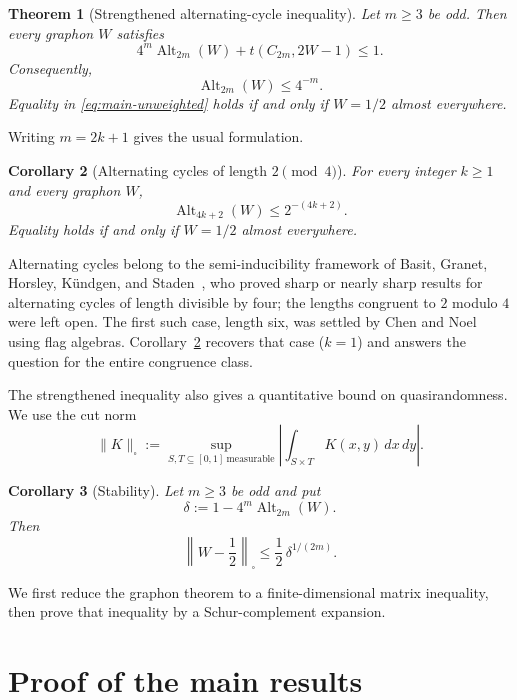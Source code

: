 \documentclass[11pt]{article}
\newtheorem{theorem}{Theorem}[section]
\newtheorem{corollary}[theorem]{Corollary}
\newcommand{\Alt}{\operatorname{Alt}}
\begin{document}
\begin{theorem}[Strengthened alternating-cycle inequality]
\label{thm:main}
Let $m\ge 3$ be odd.  Then every graphon $W$ satisfies
\begin{equation}
  4^m\Alt_{2m}(W)+t(C_{2m},2W-1)\le 1.
  \label{eq:main-strengthened}
\end{equation}
Consequently,
\begin{equation}
  \Alt_{2m}(W)\le 4^{-m}.
  \label{eq:main-unweighted}
\end{equation}
Equality in \eqref{eq:main-unweighted} holds if and only if
$W=1/2$ almost everywhere.
\end{theorem}

Writing $m=2k+1$ gives the usual formulation.

\begin{corollary}[Alternating cycles of length $2\pmod 4$]
\label{cor:4k2}
For every integer $k\ge 1$ and every graphon $W$,
\[
  \Alt_{4k+2}(W)\le 2^{-(4k+2)}.
\]
Equality holds if and only if $W=1/2$ almost everywhere.
\end{corollary}

Alternating cycles belong to the semi-inducibility framework of Basit,
Granet, Horsley, K\"undgen, and Staden~\cite{BGHKS}, who proved sharp
or nearly sharp results for alternating cycles of length divisible by
four; the lengths congruent to $2$ modulo $4$ were left open.  The
first such case, length six, was settled by Chen and
Noel~\cite{ChenNoel} using flag algebras.
Corollary~\ref{cor:4k2} recovers that case ($k=1$) and answers the
question for the entire congruence class.

The strengthened inequality also gives a quantitative bound on
quasirandomness.  We use the cut norm
\[
  \|K\|_{\square}
  :=
  \sup_{S,T\subseteq[0,1]\ \mathrm{measurable}}
  \left|\int_{S\times T}K(x,y)\,dx\,dy\right|.
\]

\begin{corollary}[Stability]
\label{cor:stability}
Let $m\ge 3$ be odd and put
\[
  \delta:=1-4^m\Alt_{2m}(W).
\]
Then
\begin{equation}
  \left\|W-\frac12\right\|_{\square}
  \le
  \frac12\,\delta^{1/(2m)}.
  \label{eq:stability}
\end{equation}
\end{corollary}

We first reduce the graphon theorem to a finite-dimensional matrix
inequality, then prove that inequality by a Schur-complement expansion.

\section{Proof of the main results}
\end{document}

